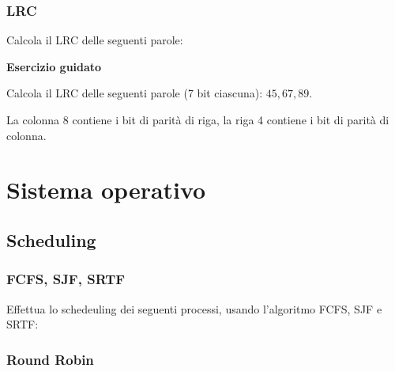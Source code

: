 \documentclass[11pt,fleqn]{book}
\begin{document}
\newpage


\newpage

\section{LRC}
Calcola il LRC delle seguenti parole:

\begin{esercizio}[1]
    \textbf{Esercizio guidato}

    Calcola il LRC delle seguenti parole (7 bit ciascuna): $45, 67, 89$.

    \immediate{}
    

    La colonna 8 contiene i bit di parità di riga, la riga 4 contiene i bit di parità di colonna.
\end{esercizio}




\part{Sistema operativo}


\chapter{Scheduling}

\section{FCFS, SJF, SRTF}

Effettua lo schedeuling dei seguenti processi, usando l'algoritmo FCFS, SJF e SRTF:


\newpage

\section{Round Robin}
\end{document}
